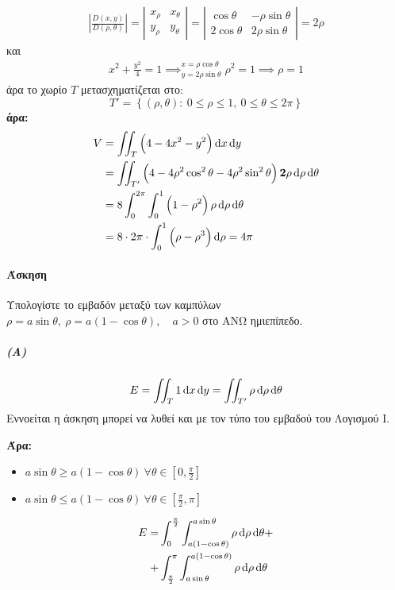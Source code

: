 \documentclass[11pt,a4paper,titlepage,draft]{article}
\begin{document}
\begin{align*}
\left| \frac{D(x,y)}{D(\rho,\theta)} \right| =
\left|
\begin{matrix}
x_\rho&x_\theta\\
y_\rho&y_\theta
\end{matrix}
\right| = \left|
\begin{matrix}
\cos\theta&-\rho\sin\theta\\
2\cos\theta&2\rho\sin\theta
\end{matrix}
\right| = 2\rho
\end{align*}
και
\begin{align*}
x^2+\frac{y^2}{4}=1 \implies^{x=\rho\cos\theta}_{y=2\rho\sin\theta}
\rho^2=1 \implies \boxed{\rho=1}
\end{align*}
άρα το χωρίο \(T\) μετασχηματίζεται στο:
\[
T' =  \left\lbrace 
(\rho,\theta):\ 0\leq\rho\leq1,\ 0\leq\theta\leq2\pi
 \right\rbrace
\]
\textbf{άρα:}
\begin{align*}
V&=\iint_T \left( 4-4x^2-y^2\right)\dif x\dif y\\
&= \iint_{T'} \left( 4-4\rho^2\cos^2\theta-4\rho^2\sin^2\theta\right)
\mathbf{2\rho}\dif\rho\dif\theta\\
&=
8\int_0^{2\pi} \int_0^1 \left(1-\rho^2\right)\rho\dif\rho\dif\theta \\
&= 8\cdot2\pi\cdot \int_0^1 \left(\rho-\rho^3\right)\dif\rho = 4\pi
\end{align*}

\paragraph{Άσκηση}
Υπολογίστε το εμβαδόν μεταξύ των καμπύλων \(\rho=a\sin\theta,\ \rho=a\left(1-\cos\theta\right),\quad a>0\) στο ΑΝΩ ημιεπίπεδο.

\subparagraph{(Α)}
\[
E = \iint_T 1 \dif x \dif y = \iint_{T'} \rho\dif\rho\dif\theta
\]
Εννοείται η άσκηση μπορεί να λυθεί και με τον τύπο του εμβαδού του Λογισμού \textlatin{I}.

\textbf{Άρα:}
\begin{itemize}
\item \(a\sin\theta \geq a(1-\cos\theta)\ \forall \theta \in [0,\frac{\pi}{2}]\)
\item \(a\sin\theta\leq a(1-\cos\theta)\ \forall \theta \in [\frac{\pi}{2},\pi]\)
\end{itemize}

\begin{align*}
E=&\int_0^\frac{\pi}{2}\int^{a\sin\theta}_{a(1-\cos\theta)}\rho\dif\rho\dif\theta +
\\
+&\int_\frac{\pi}{2}^\pi\int_{a\sin\theta}^{a(1-\cos\theta)}\rho\dif\rho\dif\theta
\end{align*}
\end{document}
